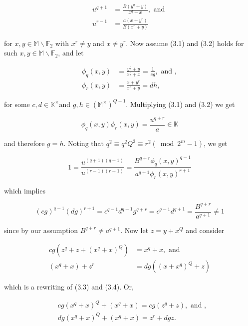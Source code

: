 \documentclass[10pt]{article}
\begin{document}
\begin{align*}
u^{q+1} & =\frac{B\left(y^{q}+y\right)}{x^{q}+x}, \text { and }  \tag{3.1}\\
u^{r-1} & =\frac{a\left(x+y^{r}\right)}{B\left(x^{r}+y\right)} \tag{3.2}
\end{align*}


for $x, y \in \mathbb{M} \backslash \mathbb{F}_{2}$ with $x^{r} \neq y$ and $x \neq y^{r}$. Now assume (3.1) and (3.2) holds for such $x, y \in \mathbb{M} \backslash \mathbb{F}_{2}$, and let


\begin{align*}
\phi_{q}(x, y) & =\frac{y^{q}+y}{x^{q}+x}=\frac{1}{c g}, \text { and },  \tag{3.3}\\
\phi_{r}(x, y) & =\frac{x+y^{r}}{x^{r}+y}=d h, \tag{3.4}
\end{align*}


for some $c, d \in \mathbb{K}^{\times}$and $g, h \in\left(\mathbb{M}^{\times}\right)^{Q-1}$. Multiplying (3.1) and (3.2) we get

$$
\phi_{q}(x, y) \phi_{r}(x, y)=\frac{u^{q+r}}{a} \in \mathbb{K}
$$

and therefore $g=h$. Noting that $q^{2} \equiv q^{2} Q^{2} \equiv r^{2}\left(\bmod 2^{m}-1\right)$, we get

$$
1=\frac{u^{(q+1)(q-1)}}{u^{(r-1)(r+1)}}=\frac{B^{q+r} \phi_{q}(x, y)^{q-1}}{a^{q+1} \phi_{r}(x, y)^{r+1}}
$$

which implies


\begin{equation*}
(c g)^{q-1}(d g)^{r+1}=c^{q-1} d^{q+1} g^{q+r}=c^{q-1} d^{q+1}=\frac{B^{q+r}}{a^{q+1}} \neq 1 \tag{3.5}
\end{equation*}


since by our assumption $B^{q+r} \neq a^{q+1}$. Now let $z=y+x^{Q}$ and consider

$$
\begin{aligned}
c g\left(z^{q}+z+\left(x^{q}+x\right)^{Q}\right) & =x^{q}+x, \text { and } \\
\left(x^{q}+x\right)+z^{r} & =d g\left(\left(x+x^{q}\right)^{Q}+z\right)
\end{aligned}
$$

which is a rewriting of (3.3) and (3.4). Or,

$$
\begin{aligned}
& c g\left(x^{q}+x\right)^{Q}+\left(x^{q}+x\right)=c g\left(z^{q}+z\right), \text { and }, \\
& d g\left(x^{q}+x\right)^{Q}+\left(x^{q}+x\right)=z^{r}+d g z .
\end{aligned}
$$
\end{document}
